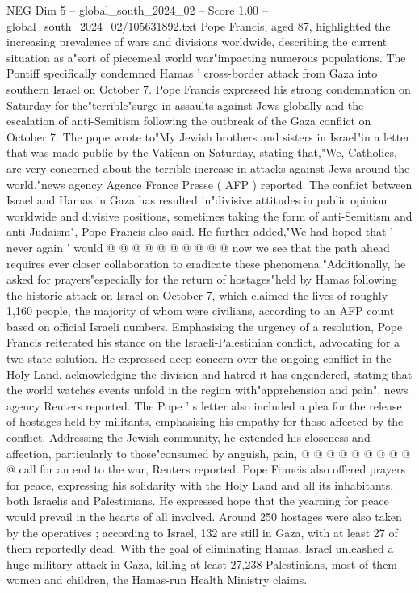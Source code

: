 \begin{textsample}{NEG Dim 5 – global\_south\_2024\_02 – Score 1.00 – global\_south\_2024\_02/105631892.txt}  \label{ex:f5_neg_308}
Pope Francis, aged 87, highlighted the increasing prevalence of wars and divisions worldwide, describing the current situation as a"sort of piecemeal world war"impacting numerous populations.
The Pontiff specifically condemned Hamas ' cross-border attack from Gaza into southern Israel on October 7.
Pope Francis expressed his strong condemnation on Saturday for the"terrible"surge in assaults against Jews globally and the escalation of anti-Semitism following the outbreak of the Gaza conflict on October 7.
The pope wrote to"My Jewish brothers and sisters in Israel"in a letter that was made public by the Vatican on Saturday, stating that,"We, Catholics, are very concerned about the terrible increase in attacks against Jews around the world,"news agency Agence France Presse ( AFP ) reported.
The conflict between Israel and Hamas in Gaza has resulted in"divisive attitudes in public opinion worldwide and divisive positions, sometimes taking the form of anti-Semitism and anti-Judaism", Pope Francis also said.
He further added,"We had hoped that ' never again ' would @ @ @ @ @ @ @ @ @ @ now we see that the path ahead requires ever closer collaboration to eradicate these phenomena."Additionally, he asked for prayers"especially for the return of hostages"held by Hamas following the historic attack on Israel on October 7, which claimed the lives of roughly 1,160 people, the majority of whom were civilians, according to an AFP count based on official Israeli numbers.
Emphasising the urgency of a resolution, Pope Francis reiterated his stance on the Israeli-Palestinian conflict, advocating for a two-state solution.
He expressed deep concern over the ongoing conflict in the Holy Land, acknowledging the division and hatred it has engendered, stating that the world watches events unfold in the region with"apprehension and pain", news agency Reuters reported.
The Pope ' s letter also included a plea for the release of hostages held by militants, emphasising his empathy for those affected by the conflict.
Addressing the Jewish community, he extended his closeness and affection, particularly to those"consumed by anguish, pain, @ @ @ @ @ @ @ @ @ @ call for an end to the war, Reuters reported.
Pope Francis also offered prayers for peace, expressing his solidarity with the Holy Land and all its inhabitants, both Israelis and Palestinians.
He expressed hope that the yearning for peace would prevail in the hearts of all involved.
Around 250 hostages were also taken by the operatives ; according to Israel, 132 are still in Gaza, with at least 27 of them reportedly dead.
With the goal of eliminating Hamas, Israel unleashed a huge military attack in Gaza, killing at least 27,238 Palestinians, most of them women and children, the Hamas-run Health Ministry claims.

\end{textsample}
